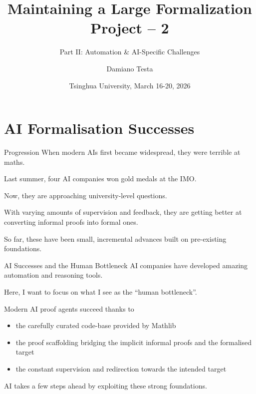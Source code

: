 \documentclass{beamer}
\title[Maintaining a Large Formalization Project 2]{Maintaining a Large Formalization Project -- 2}
\subtitle{Part II: Automation \& AI-Specific Challenges}
\author{Damiano Testa}
\institute[Warwick]{University of Warwick}
\date{Tsinghua University, March 16-20, 2026}
\begin{document}
\begin{frame}
  \titlepage
\end{frame}

\section{AI Formalisation Successes}

\begin{frame}{Progression}
When modern AIs first became widespread, they were terrible at maths.

\bigskip

Last summer, four AI companies won gold medals at the IMO.

\bigskip

Now, they are approaching university-level questions.

\bigskip

With varying amounts of supervision and feedback, they are getting better at converting informal proofs into formal ones.

\bigskip

So far, these have been small, incremental advances built on pre-existing foundations.
\end{frame}

\begin{frame}{AI Successes and the Human Bottleneck}
AI companies have developed amazing automation and reasoning tools.

\bigskip

Here, I want to focus on what I see as the ``human bottleneck''.

\bigskip

Modern AI proof agents succeed thanks to

\medskip

\begin{itemize}
  \item the carefully curated code-base provided by Mathlib
  \item the proof scaffolding bridging the implicit informal proofs and the formalised target
  \item the constant supervision and redirection towards the intended target
\end{itemize}

\bigskip

AI takes a few steps ahead by exploiting these strong foundations.
\end{frame}
\end{document}
